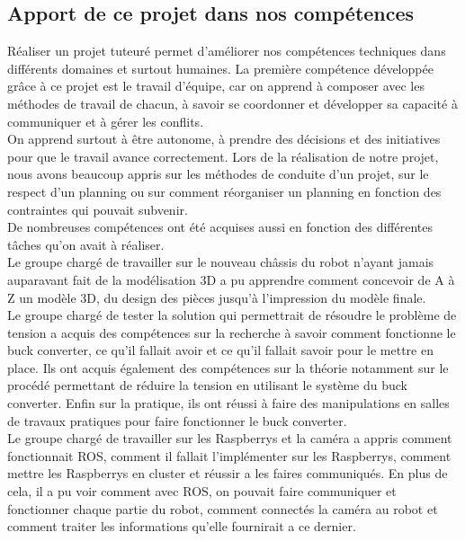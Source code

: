 \documentclass{PackagerQualityN}
\begin{document}
\subsection{Apport de ce projet dans nos compétences}

Réaliser un projet tuteuré permet d’améliorer nos compétences techniques dans différents domaines et surtout humaines.
La première compétence développée grâce à ce projet est le travail d’équipe, car on apprend à composer avec les méthodes de travail de chacun, à savoir se coordonner et développer sa capacité à communiquer et à gérer les conflits.\\

On apprend surtout à être autonome, à prendre des décisions et des initiatives pour que le travail avance correctement.
Lors de la réalisation de notre projet, nous avons beaucoup appris sur les méthodes de conduite d'un projet, sur le respect d'un planning ou sur comment réorganiser un planning en fonction des contraintes qui pouvait subvenir.\\

De nombreuses compétences ont été acquises aussi en fonction des différentes tâches qu'on avait à réaliser.\\

Le groupe chargé de travailler sur le nouveau châssis du robot n'ayant jamais auparavant fait de la modélisation 3D a pu apprendre comment concevoir de A à Z un modèle 3D, du design des pièces jusqu'à l'impression du modèle finale.\\

Le groupe chargé de tester la solution qui permettrait de résoudre le problème de tension a acquis des compétences sur la recherche à savoir comment fonctionne le buck converter, ce qu'il fallait avoir et ce qu'il fallait savoir pour le mettre en place. Ils ont acquis également des compétences sur la théorie notamment sur le procédé permettant de réduire la tension en utilisant le système du buck converter. Enfin sur la pratique, ils ont réussi à faire des manipulations en salles de travaux pratiques pour faire fonctionner le buck converter.\\

Le groupe chargé de travailler sur les Raspberrys et la caméra a appris comment fonctionnait ROS, comment il fallait l'implémenter sur les Raspberrys, comment mettre les Raspberrys en cluster et réussir a les faires communiqués.
En plus de cela, il a pu voir comment avec ROS, on pouvait faire communiquer et fonctionner chaque partie du robot, comment connectés la caméra au robot et comment traiter les informations qu'elle fournirait a ce dernier.\\
\end{document}
